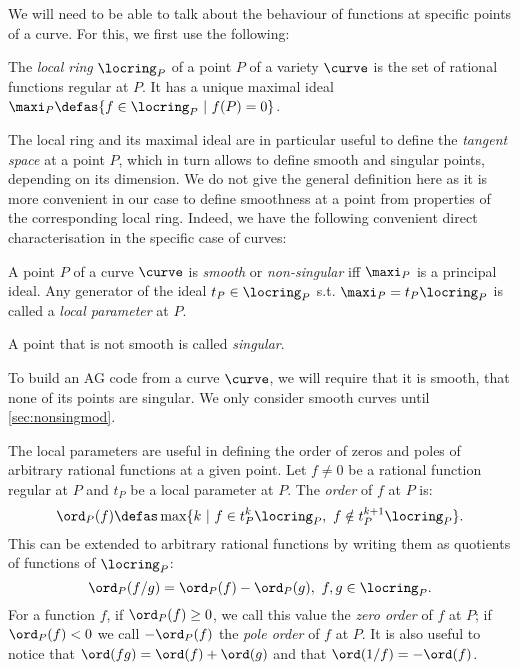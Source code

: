 We will need to be able to talk about the behaviour of functions at specific points of a curve. For this, we first use the following:

\begin{defi}
The \emph{local ring} $\locring_P$ of a point $P$ of a variety $\curve$ is the set of rational functions regular at $P$.
It has a unique maximal ideal $\maxi_P \defas \{f \in \locring_P ~|~ f(P) = 0\}$.
\end{defi}

The local ring and its maximal ideal are in particular useful to define the \emph{tangent space} at a point $P$, which in turn allows to define smooth and singular points,
depending on its dimension.
We do not give the general definition here as it is more convenient in our case to define smoothness at a point from properties of the corresponding local ring.
Indeed, we have the following convenient direct characterisation in the specific case of curves:

\begin{defi}
A point $P$ of a curve $\curve$ is \emph{smooth} or \emph{non-singular} iff $\maxi_P$ is a principal ideal. Any generator of the ideal $t_P \in \locring_P$ s.t. $\maxi_P = t_P\locring_P$
is called a \emph{local parameter} at $P$.

\noindent
A point that is not smooth is called \emph{singular}.
\end{defi}

To build an AG code from a curve $\curve$, we will require that it is smooth, \ie that none of its points are singular.
We only consider smooth curves until \autoref{sec:nonsingmod}.

The local parameters are useful in defining the order of zeros and poles of arbitrary rational functions at a given point.
Let $f \neq 0$ be a rational function regular at $P$ and $t_P$ be a local parameter at $P$. The \emph{order} of $f$ at $P$ is:
\[
\ord_P(f) \defas \max \{k~ |~ f \in t_P^k\locring_P,~ f \notin t_P^{k+1}\locring_P\}.
\]
This can be extended to arbitrary rational functions by writing them as quotients of functions of $\locring_P$:
\[
\ord_P(f/g) = \ord_P(f) - \ord_P(g),~f,g\in\locring_P.
\]
For a function $f$, if $\ord_P(f) \geq 0$, we call this value the \emph{zero order} of $f$ at $P$; if $\ord_P(f) < 0$
we call $-\ord_P(f)$ the \emph{pole order} of $f$ at $P$.
It is also useful to notice that
$\ord(fg) = \ord(f) + \ord(g)$ and that $\ord(1/f) = -\ord(f)$.

